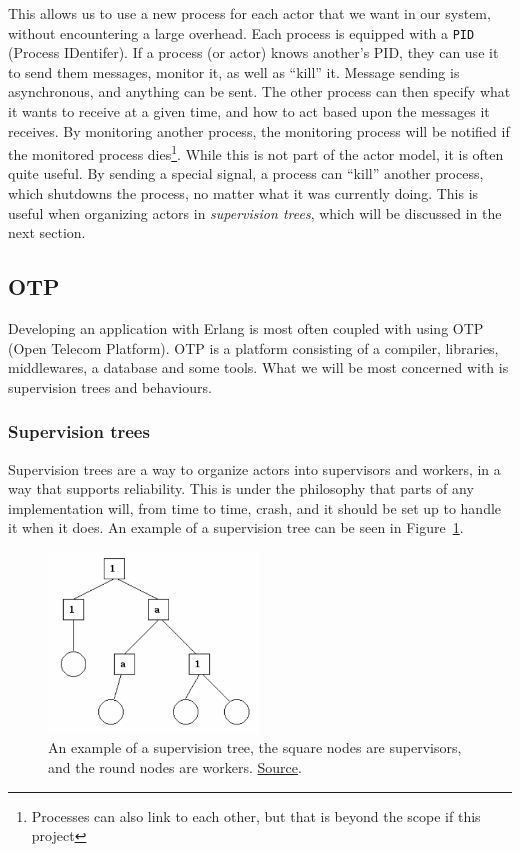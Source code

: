 \documentclass[a4paper]{article}
\newcommand\figref[1]{Figure~\ref{#1}}
\begin{document}
\noindent This allows us to use a new process for each actor that we want in our
system, without encountering a large overhead. Each process is equipped with a
\texttt{PID} (Process IDentifer). If a process (or actor) knows another's PID,
they can use it to send them messages, monitor it, as well as ``kill'' it.
Message sending is asynchronous, and anything can be sent. The other process can
then specify what it wants to receive at a given time, and how to act based upon
the messages it receives. By monitoring another process, the monitoring process
will be notified if the monitored process dies\footnote{Processes can also link
to each other, but that is beyond the scope if this project}. While this is not
part of the actor model, it is often quite useful. By sending a special signal,
a process can ``kill'' another process, which shutdowns the process, no matter
what it was currently doing. This is useful when organizing actors in
\textit{supervision trees}, which will be discussed in the next section.

\subsection{OTP}
Developing an application with Erlang is most often coupled with using OTP (Open
Telecom Platform). OTP is a platform consisting of a compiler, libraries,
middlewares, a database and some tools\cite{ErlangOTPDocs}. What we will be most
concerned with is supervision trees and behaviours.

\subsubsection{Supervision trees}
Supervision trees are a way to organize actors into supervisors and workers, in
a way that supports reliability. This is under the philosophy that parts of any
implementation will, from time to time, crash, and it should be set up to handle
it when it does. An example of a supervision tree can be seen in
\figref{fig:supervision_tree}.

\begin{figure}[h]
  \centering
  \includegraphics[width=0.5\textwidth]{./resources/SupervisionTree.png}
  \caption{An example of a supervision tree, the square nodes are supervisors,
    and the round nodes are workers.
    \href{https://erlang.org/doc/design_principles/des_princ.html}{Source}.}
  \label{fig:supervision_tree}
\end{figure}
\end{document}
